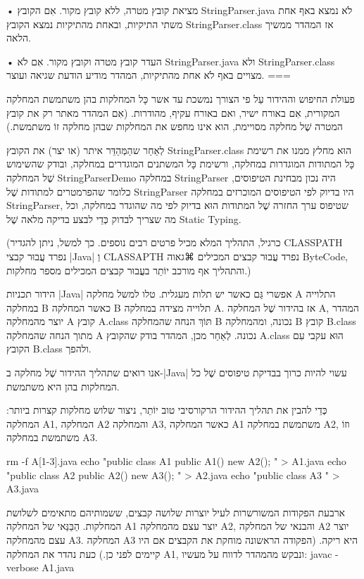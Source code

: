 • מציאת קובץ מטרה, ללא קובץ מקור. אִם הקובץ StringParser.java לֹא נמצא באף
אחת משתי התיקיות, ובאחת מהתיקיות נמצא הקובץ StringParser.class אז המהדר
ממשיך הלאה.

• העדר קובץ מטרה וקובץ מקור. אִם לֹא StringParser.java ולא StringParser.class
מצויים באף לֹא אחת מהתיקיות, המהדר מודיע הודעת שגיאה ועוצר.
===

פעולת החיפוש וההידור עַל פי הצורך נמשכת עד אשר כָּל המחלקות בהן משתמשת
המחלקה המקורית, אִם באורח ישיר, ואם באורח עקיף, מהודרות. (אִם המהדר מאתר
רק את קובץ המטרה שֶׁל מחלקה מסויימת, הוא אינו מחפש את המחלקות
שבהן מחלקה זוֹ משתמשת.)

לְאַחַר שהַמְּהַדֵּר איתר (או יצר) את הקובץ StringParser.class הוּא מחלץ
ממנו את רשימת כָּל המתודות המוגדרות במחלקה, ורשימת כָּל המשתנים המוגדרים
במחלקה, ובודק שהשימוש שֶׁל המחלקה StringParserDemo במחלקה StringParser היה
נכון מבחינת הטיפוסים, כלומר שהפרמטרים למתודות שֶׁל StringParser היו בדיוק לפי
הטיפוסים המוכרזים במחלקה StringParser, שטיפוס ערך החזרה שֶׁל המתודות הוּא בדיוק
לפי מה שהוגדר במחלקה, וכל מה שצריך לבדוק כְּדֵי לבצע בדיקה מלאה שֶׁל Static
Typing.

(כרגיל, התהליך המלא מכיל פרטים רבים נוספים. כך למשל, ניתן להגדיר CLASSPATH
נפרד עֲבוּר קבצי \E|Java| וְ CLASSAPTH נפרד עֲבוּר קבצים המכילים ⌘גאוה ByteCode,
והתהליך אף מורכב יוֹתֵר בעֲבוּר קבצים המכילים מספר מחלקות.)

הידור תכניות \E|Java| אפשרי גַּם כאשר יש תלות מעגלית. טלו למשל מחלקה A
התלוייה במחלקה B כאשר המחלקה B תלוייה מצידה במחלקה A. אז בהידור שֶׁל
המחלקה A, המהדר יוצר מהמחלקה A קובץ A.class תּוֹךְ הנחה שהמחלקה B
נכונה, ומהמחלקה B קובץ B.class מתוך הנחה שהמחלקה A נכונה. לְאַחַר מכן,
המהדר בודק שהקובץ A.class הוּא עקבי עִם הקובץ B.class ולהפך.

אנו רואים שתהליך ההידור שֶׁל מחלקה ב-|Java| עשוי להיות כרוך בבדיקת טיפוסים
שֶׁל כל המחלקות בהן היא משתמשת.

כְּדֵי להבין את תהליך ההידור הרקורסיבי טוב יוֹתֵר, ניצור שלוש מחלקות קצרות
ביותר: המחלקה A1, המחלקה A2 והמחלקה A3, כאשר המחלקה A1 משתמשת
במחלקה A2, וזוֹ משתמשת במחלקה A3.

rm -f A[1-3].java
echo "public class A1 { public A1() { new A2(); }}" > A1.java
echo "public class A2 { public A2() { new A3(); }}" > A2.java
echo "public class A3 { }" > A3.java
\END

ארבעת הפקודות המשורשרות לעיל יוצרות שלושה קבצים, ששמותיהם מתאימים לשלושת
המחלקות. הַבַּנַּאי של המחלקה A1 יוצר עצם מהמחלקה A2, והבנאי של
המחלקה A2 יוצר עצם מהמחלקה A3. המחלקה A3 היא ריקה. (הפקודה הראשונה
מוחקת את הקבצים אם היו קיימים לפני כן.)
כעת נהדר את המחלקה A1, ונבקש מהמהדר לדווח על מעשיו:
javac -verbose A1.java
\END


